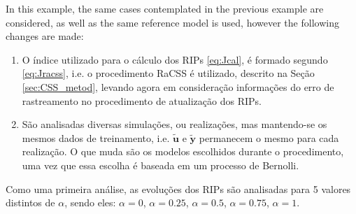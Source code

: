 
\begin{exmp} \label{ex:52}

In this example, the same cases contemplated in the previous example are considered, as well as the same reference model is used, however the following changes are made:
\begin{enumerate}
   \setlength\itemsep{0.1pt}
  \item O índice utilizado para o cálculo dos RIPs \eqref{eq:Jcal}, é formado segundo \eqref{eq:Jracss}, i.e. o procedimento RaCSS é utilizado, descrito na Seção \ref{sec:CSS_metod}, levando agora em consideração informações do erro de rastreamento no procedimento de atualização dos RIPs.
  \item São analisadas diversas simulações, ou realizações, mas mantendo-se os mesmos dados de treinamento, i.e. $\tilde{\bm{u}}$ e $\tilde{\bm{y}}$ permanecem o mesmo para cada realização. O que muda são os modelos escolhidos durante o procedimento, uma vez que essa escolha é baseada em um processo de Bernolli.
\end{enumerate}

Como uma primeira análise, as evoluções dos RIPs são analisadas para 5 valores distintos de $\alpha$, sendo eles: $\alpha=0$, $\alpha=0.25$, $\alpha=0.5$, $\alpha=0.75$, $\alpha=1$.


\end{exmp}
